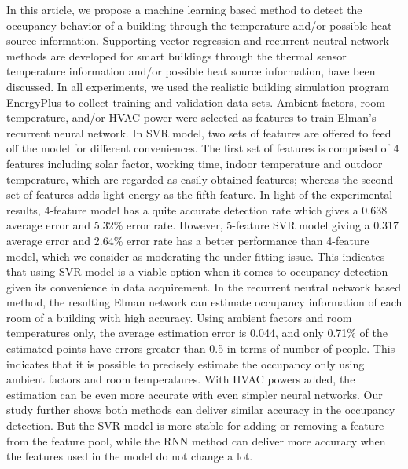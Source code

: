 \documentclass[acmtodaes,notfinal]{acmtrans2m}
\begin{document}
In this article, we propose a machine learning based method to
detect the occupancy behavior of a building through the temperature
and/or possible heat source information. Supporting vector regression and recurrent neutral
network methods are developed for smart buildings through the thermal sensor
temperature information and/or possible heat source information, have
been discussed. In all experiments, we used the realistic building
simulation program EnergyPlus to collect training and validation
data sets. Ambient factors, room temperature, and/or HVAC power were
selected as features to train Elman's recurrent neural network.
In SVR model, two sets of features are offered to feed off the
model for different conveniences. The first set of features is
comprised of 4 features including solar factor, working time, indoor
temperature and outdoor temperature, which are regarded as easily
obtained features; whereas the second set of features adds light
energy as the fifth feature. In light of the experimental results,
4-feature model has a quite accurate detection rate which gives a
0.638 average error and 5.32\% error rate. However, 5-feature SVR
model giving a 0.317 average error and 2.64\% error rate has a better
performance than 4-feature model, which we consider as moderating the
under-fitting issue. This indicates that using SVR model is a viable
option when it comes to occupancy detection given its convenience in
data acquirement. In the recurrent neutral network based method, the
resulting Elman network can estimate occupancy information of each
room of a building with high accuracy. Using ambient factors and room
temperatures only, the average estimation error is 0.044, and only
0.71\% of the estimated points have errors greater than 0.5 in terms
of number of people. This indicates that it is possible to precisely
estimate the occupancy only using ambient factors and room
temperatures. With HVAC powers added, the estimation can be even more
accurate with even simpler neural networks.  Our study further shows
both methods can deliver similar accuracy in the occupancy detection.
\textcolor{feb18rev}{But the SVR model is more stable for adding or removing a feature
from the feature pool, while the RNN method can deliver more accuracy when the features used
in the model do not change a lot.}

\end{document}
